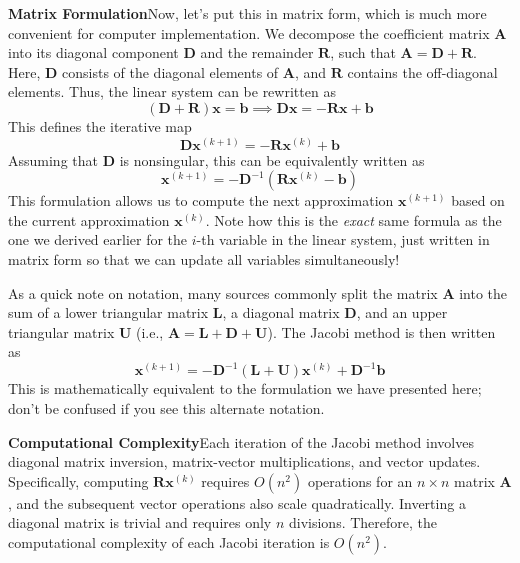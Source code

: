 \textbf{Matrix Formulation}\quad Now, let's put this in matrix form, which is much more convenient for computer implementation. We decompose the coefficient matrix $\mathbf{A}$ into its diagonal component $\mathbf{D}$ and the remainder $\mathbf{R}$, such that $\mathbf{A} = \mathbf{D} + \mathbf{R}$. Here, $\mathbf{D}$ consists of the diagonal elements of $\mathbf{A}$, and $\mathbf{R}$ contains the off-diagonal elements. Thus, the linear system can be rewritten as
\begin{equation*}
    \left( \mathbf{D} + \mathbf{R} \right)\mathbf{x} = \mathbf{b}
    \implies
    \mathbf{D}\mathbf{x} = -\mathbf{R}\mathbf{x} + \mathbf{b}
\end{equation*}
This defines the iterative map
\begin{equation*}
    \mathbf{D}\mathbf{x}^{(k+1)} = -\mathbf{R}\mathbf{x}^{(k)} + \mathbf{b}
\end{equation*}
Assuming that $\mathbf{D}$ is nonsingular, this can be equivalently written as
\begin{equation*}
    \mathbf{x}^{(k+1)} = -\mathbf{D}^{-1}(\mathbf{R}\mathbf{x}^{(k)} - \mathbf{b})
\end{equation*}
This formulation allows us to compute the next approximation $\mathbf{x}^{(k+1)}$ based on the current approximation $\mathbf{x}^{(k)}$. Note how this is the \textit{exact} same formula as the one we derived earlier for the $i$-th variable in the linear system, just written in matrix form so that we can update all variables simultaneously!

As a quick note on notation, many sources commonly split the matrix $\mathbf{A}$ into the sum of a lower triangular matrix $\mathbf{L}$, a diagonal matrix $\mathbf{D}$, and an upper triangular matrix $\mathbf{U}$ (i.e., $\mathbf{A} = \mathbf{L} + \mathbf{D} + \mathbf{U}$). The Jacobi method is then written as
\begin{equation*}
    \mathbf{x}^{(k+1)} = -\mathbf{D}^{-1}(\mathbf{L} + \mathbf{U})\mathbf{x}^{(k)} + \mathbf{D}^{-1}\mathbf{b}
\end{equation*}
This is mathematically equivalent to the formulation we have presented here; don't be confused if you see this alternate notation.

\textbf{Computational Complexity}\quad Each iteration of the Jacobi method involves diagonal matrix inversion, matrix-vector multiplications, and vector updates. Specifically, computing $\mathbf{R}\mathbf{x}^{(k)}$ requires $O(n^2)$ operations for an $n \times n$ matrix $\mathbf{A}$, and the subsequent vector operations also scale quadratically. Inverting a diagonal matrix is trivial and requires only $n$ divisions. Therefore, the computational complexity of each Jacobi iteration is $O(n^2)$.

